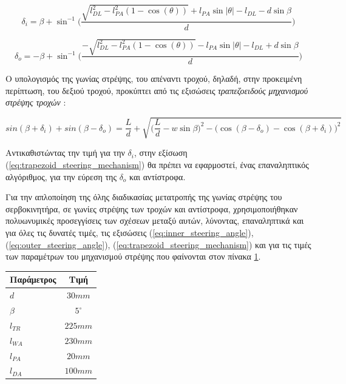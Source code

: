 \begin{equation}
	\label{eq:inner_steering_angle}
	\delta_i = \beta + \sin^{-1}{ \Bigg(
		\frac{
		\sqrt{l_{DL}^2 - l_{PA}^2(1-\cos(\theta))} + l_{PA} \sin{|\theta|} - l_{DL} - d \sin{\beta}}{d}} \Bigg)
\end{equation}

\begin{equation}
	\label{eq:outer_steering_angle}
	\delta_o = -\beta + \sin^{-1}{ \Bigg(
		\frac{
		-\sqrt{l_{DL}^2 - l_{PA}^2(1-\cos(\theta))} - l_{PA} \sin{|\theta|} - l_{DL} + d \sin{\beta}}{d}} \Bigg)
\end{equation}

\bigskip
Ο υπολογισμός της γωνίας στρέψης, του απέναντι τροχού, δηλαδή, στην προκειμένη περίπτωση, του δεξιού τροχού, προκύπτει από τις εξισώσεις \textit{τραπεζοειδούς μηχανισμού στρέψης τροχών} \cite{vehicle_dynamics}:

\begin{equation}
	\label{eq:trapezoid_steering_mechanism}
	sin(\beta + \delta_i) + sin(\beta - \delta_o) = \frac{L}{d} + \sqrt{\big(\frac{L}{d} - w \sin{\beta} \big)^2 - \big(\cos{(\beta-\delta_o)} - \cos{(\beta+\delta_i)}\big)^2}
\end{equation}

\bigskip
Αντικαθιστώντας την τιμή για την $\delta_i$, στην εξίσωση (\ref{eq:trapezoid_steering_mechanism}) θα πρέπει να εφαρμοστεί, ένας επαναληπτικός αλγόριθμος, για την εύρεση της $\delta_o$ και αντίστροφα.

\bigskip
Για την απλοποίηση της όλης διαδικασίας μετατροπής της γωνίας στρέψης του σερβοκινητήρα, σε γωνίες στρέψης των τροχών και αντίστροφα, χρησιμοποιήθηκαν πολυωνυμικές προσεγγίσεις των σχέσεων μεταξύ αυτών, λύνοντας, επαναληπτικά και για όλες τις δυνατές τιμές, τις εξισώσεις (\ref{eq:inner_steering_angle}), (\ref{eq:outer_steering_angle}), (\ref{eq:trapezoid_steering_mechanism}) και για τις τιμές των παραμέτρων του μηχανισμού στρέψης που φαίνονται στον πίνακα \ref{tab:steering_parameter_values}.

\bigskip
\begin{table}[!ht]
	\centering
	\begin{tabular}{| l | c |}
		\hline
		\textbf{Παράμετρος} & \textbf{Τιμή}\\ \hline
		$d$ & $30mm$ \\ \hline
		$\beta$ & $5^\circ$\\ \hline
		$l_{TR}$ & $225mm$\\ \hline
		$l_{WA}$ & $230mm$\\ \hline
		$l_{PA}$ & $20mm$\\ \hline
		$l_{DA}$ & $100mm$\\ \hline
	\end{tabular}
	\label{tab:steering_parameter_values}
\end{table}

